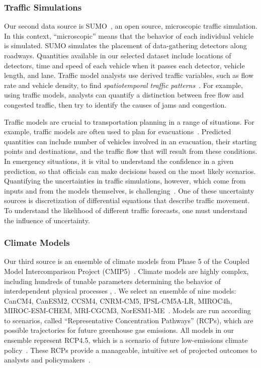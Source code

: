 \subsubsection{Traffic Simulations}
\label{traffic_sims}

Our second data source is SUMO~\cite{SUMO2012}, an open source, microscopic traffic simulation. In this context, ``microscopic'' means that the behavior of each individual vehicle is simulated. SUMO simulates the placement of data-gathering detectors along roadways. Quantities available in our selected dataset include locations of detectors, time and speed of each vehicle when it passes each detector, vehicle length, and lane. Traffic model analysts use derived traffic variables, such as flow rate and vehicle density, to find \textit{spatiotemporal traffic patterns}~\cite{kerner2014introduction}. For example, using traffic models, analysts can quantify a distinction between free flow and congested traffic, then try to identify the causes of jams and congestion.

Traffic models are crucial to transportation planning in a range of situations. For example, traffic models are often used to plan for evacuations~\cite{Pel2012}. Predicted quantities can include number of vehicles involved in an evacuation, their starting points and destinations, and the traffic flow that will result from these conditions. In emergency situations, it is vital to understand the confidence in a given prediction, so that officials can make decisions based on the most likely scenarios.
Quantifying the uncertainties in traffic simulations, however, which come from inputs and from the models themselves, is challenging~\cite{traffic_volume}. One of these uncertainty sources is discretization of differential equations that describe traffic movement. To understand the likelihood of different traffic forecasts, one must understand the influence of uncertainty.
          
\subsubsection{Climate Models}
\label{climate_models}

Our third source is an ensemble of climate models from Phase 5 of the Coupled Model Intercomparison Project (CMIP5)~\cite{taylor2012overview}. Climate models are highly complex, including hundreds of tunable parameters determining the behavior of interdependent physical processes \cite{debusschere}, \cite{randall}. We select an ensemble of nine models: CanCM4, CanESM2, CCSM4, CNRM-CM5, IPSL-CM5A-LR, MIROC4h, MIROC-ESM-CHEM, MRI-CGCM3, NorESM1-ME~\cite{taylor2012overview}. Models are run according to scenarios, called ``Representative Concentration Pathways'' (RCPs), which are possible trajectories for future greenhouse gas emissions. All models in our ensemble represent RCP4.5, which is a scenario of future low-emissions climate policy~\cite{van2011representative}. These RCPs provide a manageable, intuitive set of projected outcomes to analysts and policymakers~\cite{mcsweeney}.

